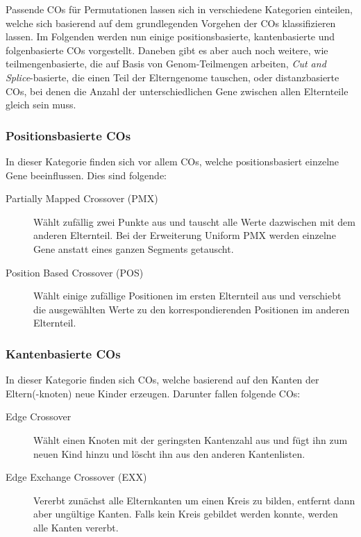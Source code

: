 	Passende COs für Permutationen lassen sich in verschiedene Kategorien einteilen, welche sich basierend auf dem grundlegenden Vorgehen der COs klassifizieren lassen. Im Folgenden werden nun einige positionsbasierte, kantenbasierte und folgenbasierte COs vorgestellt. Daneben gibt es aber auch noch weitere, wie \zB teilmengenbasierte, die auf Basis von Genom-Teilmengen arbeiten, \textit{Cut and Splice}-basierte, die einen Teil der Elterngenome tauschen, oder distanzbasierte COs, bei denen die Anzahl der unterschiedlichen Gene zwischen allen Elternteile gleich sein muss.
	
	\subsubsection{Positionsbasierte COs}
	
		In dieser Kategorie finden sich vor allem COs, welche positionsbasiert einzelne Gene beeinflussen. Dies sind \uA folgende:
		
		\begin{description}
			\item[Partially Mapped Crossover (PMX)] Wählt zufällig zwei Punkte aus und tauscht alle Werte dazwischen mit dem anderen Elternteil. Bei der Erweiterung Uniform PMX werden einzelne Gene anstatt eines ganzen Segments getauscht.\cite{GAforTSP}\cite{COforPermutations}\cite{COforQAP}
			\item[Position Based Crossover (POS)] Wählt einige zufällige Positionen im ersten Elternteil aus und verschiebt die ausgewählten Werte zu den korrespondierenden Positionen im anderen Elternteil.\cite{COforPermutations}
		\end{description}
		
	\subsubsection{Kantenbasierte COs}
	
		In dieser Kategorie finden sich COs, welche basierend auf den Kanten der Eltern(-knoten) neue Kinder erzeugen. Darunter fallen \uA folgende COs:
		
		\begin{description}
			\item[Edge Crossover] Wählt einen Knoten mit der geringsten Kantenzahl aus und fügt ihn zum neuen Kind hinzu und löscht ihn aus den anderen Kantenlisten.\cite{COforPermutations}
			\item[Edge Exchange Crossover (EXX)] Vererbt zunächst alle Elternkanten um einen Kreis zu bilden, entfernt dann aber ungültige Kanten. Falls kein Kreis gebildet werden konnte, werden alle Kanten vererbt.\cite{EdgeCOforTSP}
		\end{description}
	
